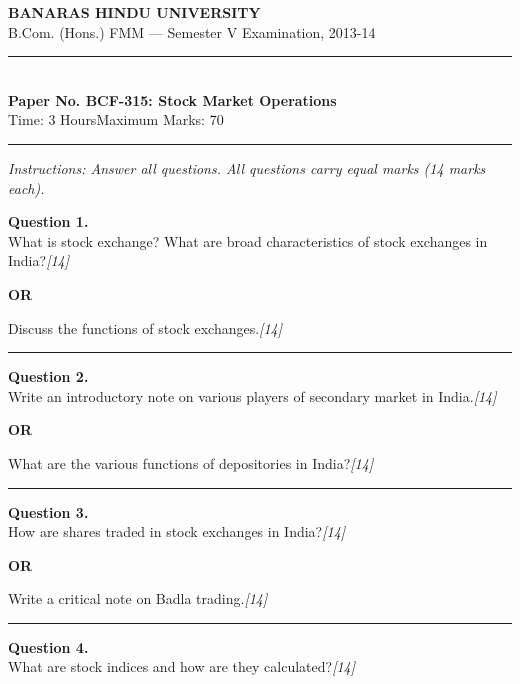 \documentclass[11pt,a4paper]{article}
\newcommand{\pts}[1]{\hfill   \textit{[#1]}}
\begin{document}
\begin{center}
  {\large\bfseries BANARAS HINDU UNIVERSITY}\\[2pt]
  {\normalsize B.Com. (Hons.) FMM --- Semester V Examination, 2013-14}\\[6pt]
  \rule{0.8\linewidth}{0.5pt}\\[6pt]
  {\large\bfseries Paper No. BCF-315: Stock Market Operations}\\[4pt]
  {\normalsize Time: 3 Hours\hfill Maximum Marks: 70}
\end{center}

\rule{\linewidth}{0.4pt}

\smallskip



\noindent   \textit{Instructions: Answer all questions. All questions carry equal marks (14 marks each).}

\bigskip




\noindent   \textbf{Question 1.} \\
What is stock exchange? What are broad characteristics of stock exchanges in India?\pts{14}

\centerline{   \textbf{OR}}

Discuss the functions of stock exchanges.\pts{14}

\medskip\rule{\linewidth}{0.2pt}




\noindent   \textbf{Question 2.} \\
Write an introductory note on various players of secondary market in India.\pts{14}

\centerline{   \textbf{OR}}

What are the various functions of depositories in India?\pts{14}

\medskip\rule{\linewidth}{0.2pt}




\noindent   \textbf{Question 3.} \\
How are shares traded in stock exchanges in India?\pts{14}

\centerline{   \textbf{OR}}

Write a critical note on Badla trading.\pts{14}

\medskip\rule{\linewidth}{0.2pt}




\noindent   \textbf{Question 4.} \\
What are stock indices and how are they calculated?\pts{14}
\end{document}
